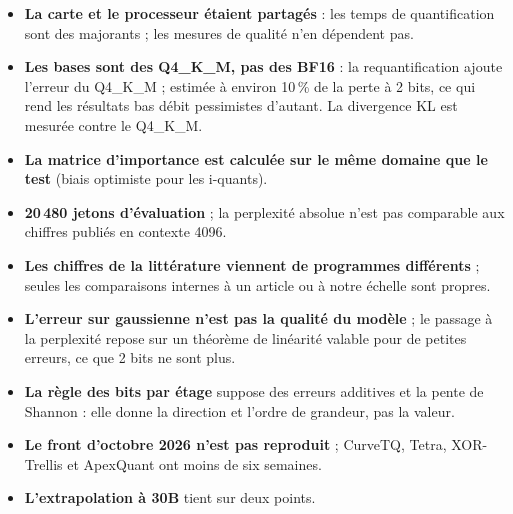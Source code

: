 \begin{faux}
\begin{itemize}
\item \textbf{La carte et le processeur étaient partagés} : les temps de quantification sont des majorants ; les mesures de qualité n'en dépendent pas.
\item \textbf{Les bases sont des Q4\_K\_M, pas des BF16} : la requantification ajoute l'erreur du Q4\_K\_M ; estimée à environ 10\,\% de la perte à 2 bits, ce qui rend les résultats bas débit pessimistes d'autant. La divergence KL est mesurée contre le Q4\_K\_M.
\item \textbf{La matrice d'importance est calculée sur le même domaine que le test} (biais optimiste pour les i-quants).
\item \textbf{20\,480 jetons d'évaluation} ; la perplexité absolue n'est pas comparable aux chiffres publiés en contexte 4096.
\item \textbf{Les chiffres de la littérature viennent de programmes différents} ; seules les comparaisons internes à un article ou à notre échelle sont propres.
\item \textbf{L'erreur sur gaussienne n'est pas la qualité du modèle} ; le passage à la perplexité repose sur un théorème de linéarité valable pour de petites erreurs, ce que 2 bits ne sont plus.
\item \textbf{La règle des bits par étage} suppose des erreurs additives et la pente de Shannon : elle donne la direction et l'ordre de grandeur, pas la valeur.
\item \textbf{Le front d'octobre 2026 n'est pas reproduit} ; CurveTQ, Tetra, XOR-Trellis et ApexQuant ont moins de six semaines.
\item \textbf{L'extrapolation à 30B} tient sur deux points.
\end{itemize}
\end{faux}
